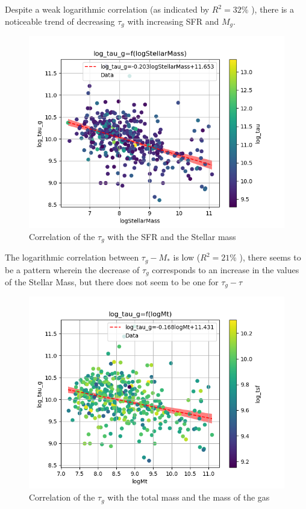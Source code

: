 \documentclass[a4paper,twocolumn]{article}
\begin{document}
Despite a weak logarithmic correlation (as indicated by \(R^2 = 32\%\) \noindent), there is a noticeable trend of decreasing \(\tau_g\) with increasing SFR and \(M_g\).

\begin{figure}[!htpb]
\centering
\includegraphics[width=.9\linewidth]{./figs/logStellarMass-log_tau_g-color_log_tau.png}
\caption{\label{fig:Correlation of the $\tau_g$ with the SFR and the Stellar mass}Correlation of the \(\tau_g\) with the SFR and the Stellar mass}
\end{figure}

The logarithmic correlation between \(\tau_g-M_*\) is low (\(R^2 = 21\%\) \noindent), there seems to be a pattern wherein the decrease of \(\tau_g\) corresponds to an increase in the values of the Stellar Mass, but there does not seem to be one for \(\tau_g-\tau\)

\begin{figure}[!htpb]
\centering
\includegraphics[width=.9\linewidth]{./figs/logMt-log_tau_g-color_log_tsf.png}
\caption{\label{fig:Correlation of the $\tau_g$ with the total mass and the mass of the gas}Correlation of the \(\tau_g\) with the total mass and the mass of the gas}
\end{figure}
\end{document}
